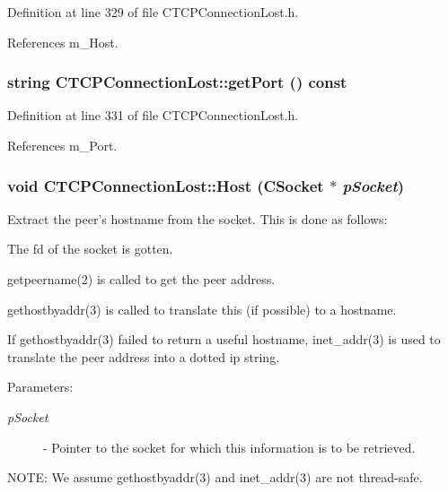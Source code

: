 Definition at line 329 of file CTCPConnection\-Lost.h.

References m\_\-Host.
\subsubsection{\setlength{\rightskip}{0pt plus 5cm}string CTCPConnection\-Lost::get\-Port () const\hspace{0.3cm}{\tt  [inline]}}\label{classCTCPConnectionLost_a6}




Definition at line 331 of file CTCPConnection\-Lost.h.

References m\_\-Port.
\subsubsection{\setlength{\rightskip}{0pt plus 5cm}void CTCPConnection\-Lost::Host ({\bf CSocket} $\ast$ {\em p\-Socket})\hspace{0.3cm}{\tt  [protected]}}\label{classCTCPConnectionLost_b2}


Extract the peer's hostname from the socket. This is done as follows:\begin{CompactItemize}
\item 
The fd of the socket is gotten.\item 
getpeername(2) is called to get the peer address.\item 
gethostbyaddr(3) is called to translate this (if possible) to a hostname.\item 
If gethostbyaddr(3) failed to return a useful hostname, inet\_\-addr(3) is used to translate the peer address into a dotted ip string.\end{CompactItemize}
\begin{Desc}
\item[Parameters: ]\par
\begin{description}
\item[{\em 
p\-Socket}]- Pointer to the socket for which this information is to be retrieved.\end{description}
\end{Desc}
NOTE: We assume gethostbyaddr(3) and inet\_\-addr(3) are not thread-safe. 

